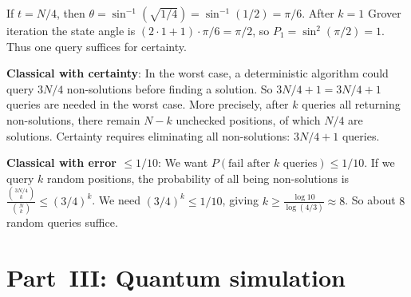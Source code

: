 \documentclass[12pt,oneside]{amsart}
\begin{document}
\begin{exercise}[Grover with $t = N/4$]
\end{exercise}
\begin{solution}
  If $t = N/4$, then $\theta = \sin^{-1}(\sqrt{1/4}) = \sin^{-1}(1/2) = \pi/6$.
  After $k=1$ Grover iteration the state angle is
  $(2\cdot 1+1)\cdot\pi/6 = \pi/2$, so
  $P_1 = \sin^2(\pi/2) = 1$.  Thus one query suffices for certainty.

  \textbf{Classical with certainty}: In the worst case, a deterministic
  algorithm could query $3N/4$ non-solutions before finding a solution.
  So $3N/4+1 = 3N/4+1$ queries are needed in the worst case.
  More precisely, after $k$ queries all returning non-solutions, there remain
  $N-k$ unchecked positions, of which $N/4$ are solutions.  Certainty
  requires eliminating all non-solutions: $3N/4+1$ queries.

  \textbf{Classical with error $\le 1/10$}: We want
  $P(\text{fail after $k$ queries}) \le 1/10$.  If we query $k$ random
  positions, the probability of all being non-solutions is
  $\frac{\binom{3N/4}{k}}{\binom{N}{k}} \le (3/4)^k$.  We need
  $(3/4)^k \le 1/10$, giving $k \ge \frac{\log 10}{\log(4/3)} \approx 8$.
  So about $8$ random queries suffice.
\end{solution}

\section*{Part~III: Quantum simulation}
\setcounter{section}{3}
\setcounter{exercise}{0}
\end{document}
